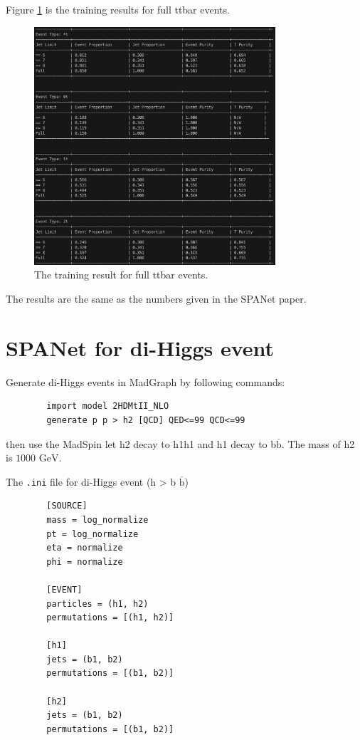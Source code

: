 \documentclass[12pt]{article}
\begin{document}
	Figure \ref{fig:full_ttbar_result} is the training results for full ttbar events. 
	\begin{figure}[htpb]
		\centering
		\includegraphics[width=0.8\textwidth]{full_ttbar_training_result.png}
		\caption{The training result for full ttbar events.}
		\label{fig:full_ttbar_result}
	\end{figure}
	The results are the same as the numbers given in the SPANet paper.

\section{SPANet for di-Higgs event}%
\label{sec:spanet_for_dihiggs_event}
	Generate di-Higgs events in MadGraph by following commands:
	\begin{verbatim}
		import model 2HDMtII_NLO
		generate p p > h2 [QCD] QED<=99 QCD<=99	
	\end{verbatim}
	then use the MadSpin let h2 decay to h1h1 and h1 decay to b$\overline{\text{b}}$. The mass of h2 is $\text{1000 GeV}$.

	The \verb+.ini+ file for di-Higgs event (h > b $\overline{\text{b}}$)
	\begin{verbatim}
		[SOURCE]
		mass = log_normalize
		pt = log_normalize
		eta = normalize
		phi = normalize

		[EVENT]
		particles = (h1, h2)
		permutations = [(h1, h2)]

		[h1]
		jets = (b1, b2)
		permutations = [(b1, b2)]

		[h2]
		jets = (b1, b2)
		permutations = [(b1, b2)]			
	\end{verbatim}
\end{document}
